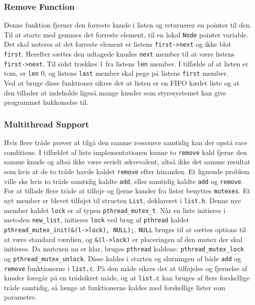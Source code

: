 \subsubsection{Remove Function}
Denne funktion fjerner den forreste knude i listen og returnerer en pointer til den. Til at starte med gemmes det forreste element, til en lokal \texttt{Node} pointer variable. Det skal noteres at det forreste element er listens \texttt{first->next} og ikke blot \texttt{first}. Herefter sættes den udtagede knudes \texttt{next} member til at være listens \texttt{first->next}. Til sidst trækkes 1 fra listens \texttt{len} member. I tilfælde af at listen er tom, er \texttt{len} 0, og listens \texttt{last} member skal pege på listens \texttt{first} member. \\

Ved at bruge disse funktioner sikres det at listen er en FIFO kædet liste og at den tillader at indeholde ligeså mange knuder som styresystemet kan give programmet hukkomelse til. 

\subsubsection{Multithread Support}
Hvis flere tråde prøver at tilgå den samme ressource samtidig kan der opstå race conditions. I tilfældet af liste implementationen kunne to \texttt{remove} kald fjerne den samme knude og altså ikke være serielt ækvevalent, altså ikke det samme resultat som hvis at de to tråde havde kaldet \texttt{remove} efter hinanden. Et lignende problem ville ske hvis to tråde samtidig kaldte \texttt{add}, eller samtidig kaldte \texttt{add} og \texttt{remove}.\\

For at tillade flere tråde at tilføje og fjerne knuder fra lister benyttes \texttt{mutexes}. Et nyt member er blevet tilføjet til structen \texttt{List}, deklareret i \texttt{list.h}. Denne nye member kaldet \texttt{lock} er af typen \texttt{pthread\_mutex\_t}. Når en liste initieres i metoden \texttt{new\_list}, initieres \texttt{lock} ved brug af \texttt{pthread} kaldet \texttt{pthread\_mutex\_init(\&(l->lock), NULL);}. \texttt{NULL} bruges til at sættes options til at være standard værdien, og \texttt{\&(l->lock)} er placeringen af den mutex der skal initieres. Da mutexen nu er klar, bruges \texttt{pthread} kaldene: \texttt{pthread\_mutex\_lock} og \texttt{pthread\_mutex\_unlock}. Disse kaldes i starten og slutningen af både \texttt{add} og \texttt{remove} funktionerne i \texttt{list.c}. På den måde sikres det at tilføjelse og fjernelse af knuder foregår på en trådsikret måde, og at \texttt{list.c} kan bruges af flere forskellige tråde samtidig, så længe at funktionerne kaldes med forskellige lister som parametre.


